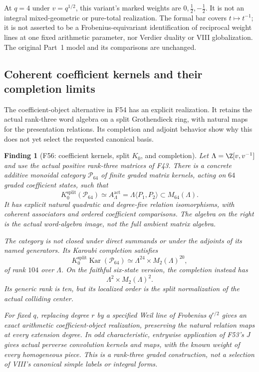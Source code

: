 \documentclass[11pt,a4paper]{article}
\newcommand{\fid}[1]{\textsf{#1}}\newcommand{\gate}[1]{\textsf{#1}}
\theoremstyle{named}\newtheorem{finding}{Finding}[section]
\theoremstyle{definition}\newtheorem{definition}[finding]{Definition}
\theoremstyle{remark}\newtheorem{remark}[finding]{Remark}
\begin{document}
At $q=4$ under $v=q^{1/2}$, this variant's marked
weights are $0,\tfrac12,-\tfrac12$.
It is not an integral mixed-geometric or pure-total
realization.
The formal bar covers $t\mapsto t^{-1}$; it is not
asserted to be a Frobenius-equivariant identification
of reciprocal weight lines at one fixed arithmetic
parameter, nor Verdier duality or VIII globalization.
The original Part~1 model and its comparisons are
unchanged.

\subsection{Coherent coefficient kernels and their completion limits}
The coefficient-object alternative in \fid{F54} has an explicit
realization. It retains the actual rank-three word algebra on a
split Grothendieck ring, with natural maps for the presentation
relations. Its completion and adjoint behavior show why this
does not yet select the requested canonical basis.

\begin{finding}[\fid{F56}: coefficient kernels, split $K_0$, and completion]
\label{f:coefficientkernelcategory}
Let $\Lambda=\Z[v,v^{-1}]$ and use the actual positive
rank-three matrices of \fid{F43}.
There is a concrete additive monoidal category
$\mathcal P_{64}$ of finite graded matrix kernels, acting
on $64$ graded coefficient states, such that
\[
 K_0^{\mathrm{split}}(\mathcal P_{64})
   \simeq A_\Lambda^{\mathrm{act}}
   =\Lambda\langle P_1,P_2\rangle
       \subset M_{64}(\Lambda).
\]
It has explicit natural quadratic and degree-five
relation isomorphisms, with coherent associators and
ordered coefficient comparisons.
The algebra on the right is the actual word-algebra
image, not the full ambient matrix algebra.

The category is not closed under direct summands
or under the adjoints of its named generators.
Its Karoubi completion satisfies
\[
 K_0^{\mathrm{split}}\operatorname{Kar}(\mathcal P_{64})
       \simeq\Lambda^{24}\times M_2(\Lambda)^{20},
\]
of rank $104$ over $\Lambda$.
On the faithful six-state version, the completion instead has
\[
 \Lambda^2\times M_2(\Lambda)^2.
\]
Its generic rank is ten, but its localized order is the
split normalization of the actual colliding center.

For fixed $q$, replacing degree $r$ by a specified Weil
line of Frobenius $q^{r/2}$ gives an exact arithmetic
coefficient-object realization, preserving the natural
relation maps at every extension degree.
In odd characteristic, entrywise application of
\fid{F53}'s $J$ gives actual perverse convolution kernels
and maps, with the known weight of every homogeneous piece.
This is a rank-three graded construction, not a selection
of VIII's canonical simple labels or integral forms.
\end{finding}
\end{document}
